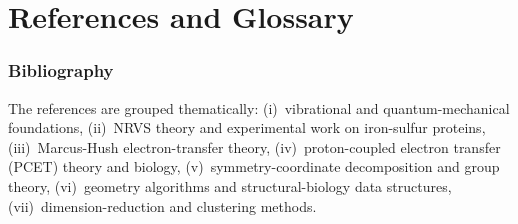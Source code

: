 \documentclass[10pt,a4paper,twoside]{article}
\begin{document}

\part{References and Glossary}

\section*{Bibliography}

The references are grouped thematically: (i)~vibrational and
quantum-mechanical foundations, (ii)~NRVS theory and experimental
work on iron-sulfur proteins, (iii)~Marcus-Hush electron-transfer
theory, (iv)~proton-coupled electron transfer (PCET) theory and
biology, (v)~symmetry-coordinate decomposition and group theory,
(vi)~geometry algorithms and structural-biology data structures,
(vii)~dimension-reduction and clustering methods.
\end{document}
